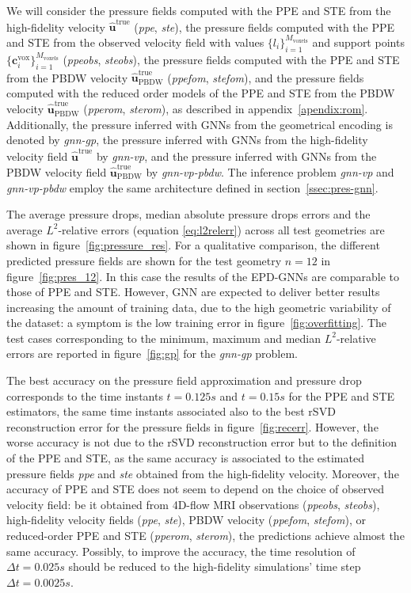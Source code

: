 We will consider the pressure fields computed with the PPE and STE from the high-fidelity velocity $\widehat{\mathbf{u}}^{\text{true}}$ (\textit{ppe}, \textit{ste}), 
the pressure fields computed with the PPE and STE from the observed velocity field with values $\{l_i\}_{i=1}^{M_{\text{voxels}}}$ and support points $\{\mathbf{c}_i^{\text{vox}}\}_{i=1}^{M_{\text{voxels}}}$ (\textit{ppeobs}, \textit{steobs}), 
the pressure fields computed with the PPE and STE from the PBDW velocity $\widehat{\mathbf{u}}^{\text{true}}_{\text{PBDW}}$ (\textit{ppefom}, \textit{stefom}), and the pressure fields 
computed with the reduced order models of the PPE and STE from the PBDW velocity $\widehat{\mathbf{u}}^{\text{true}}_{\text{PBDW}}$ (\textit{pperom}, \textit{sterom}), as described in appendix~\ref{apendix:rom}. 
%
Additionally, the pressure inferred with GNNs from the geometrical encoding is denoted by \textit{gnn-gp}, the pressure inferred with GNNs from the high-fidelity velocity field $\widehat{\mathbf{u}}^{\text{true}}$ by \textit{gnn-vp}, and the pressure inferred with GNNs from the PBDW velocity field $\widehat{\mathbf{u}}^{\text{true}}_{\text{PBDW}}$ by \textit{gnn-vp-pbdw}. The inference problem \textit{gnn-vp} and \textit{gnn-vp-pbdw} employ the same architecture defined in section~\ref{ssec:pres-gnn}.

The average pressure drops, median absolute pressure drops errors and the average $L^2$-relative errors (equation \eqref{eq:l2relerr}) across all test geometries are shown in figure~\ref{fig:pressure_res}.
For a qualitative comparison, the different predicted pressure fields are shown for the test geometry $n=12$ in figure~\ref{fig:pres_12}. 
%
In this case the results of the EPD-GNNs are comparable to those of PPE and STE. However, GNN are expected to deliver better results increasing the amount of training data,
due to the high geometric variability of the dataset: a symptom is the low training error in figure~\ref{fig:overfitting}. The test cases corresponding to the minimum, maximum and median $L^2$-relative errors are reported in figure~\ref{fig:gp} for the \textit{gnn-gp} problem. 

The best accuracy on the pressure field approximation and pressure drop corresponds to the time instants $t=0.125s$ and $t=0.15s$ for the PPE and STE estimators, the same time instants associated also to the best rSVD reconstruction error for the pressure fields in figure~\ref{fig:recerr}. However, the worse accuracy is not due to the rSVD reconstruction error but to the definition of the PPE and STE, as the same accuracy is associated to the estimated pressure fields \textit{ppe} and \textit{ste} obtained from the high-fidelity velocity. Moreover, the accuracy of PPE and STE does not seem to depend on the choice of observed velocity field: be it obtained from 4D-flow MRI observations (\textit{ppeobs}, \textit{steobs}), high-fidelity velocity fields (\textit{ppe}, \textit{ste}), PBDW velocity (\textit{ppefom}, \textit{stefom}), or reduced-order PPE and STE (\textit{pperom}, \textit{sterom}), the predictions achieve almost the same accuracy. Possibly, to improve the accuracy, the time resolution of $\Delta t=0.025s$ should be reduced to the high-fidelity simulations' time step $\Delta t=0.0025s$.

